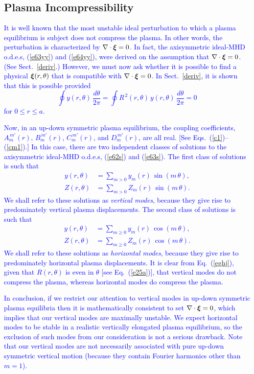 \documentclass[12pt,prb,aps]{revtex4-1}
\newcommand {\bxi}{\mbox{\boldmath$\xi$}}
\begin{document}
\subsection{Plasma Incompressibility}\label{incomp}
\textcolor{blue}{
It is well known that the most unstable ideal perturbation to which a plasma equilibrium is subject does not compress the plasma. In other words,
the perturbation is characterized by $\nabla\cdot\bxi=0$.\cite{gs1} In fact, the axisymmetric ideal-MHD o.d.e.s, (\ref{e63yy}) and (\ref{e64yy}), were derived
on the assumption that $\nabla\cdot \bxi=0$. (See Sect.~\ref{deriv}.) However, we must now ask whether it is possible to find a physical $\bxi(r,\theta)$ that is compatible
with $\nabla\cdot \bxi=0$. In Sect.~\ref{deriv}, it is shown that this is  possible provided 
\begin{equation}\label{eghj}
\oint y(r,\theta)\,\frac{d\theta}{2\pi}= \oint R^{\,2}(r,\theta)\,y(r,\theta)\,\frac{d\theta}{2\pi}=0
\end{equation}
for $0\leq r\leq a$.}

\textcolor{blue}{
Now, in an up-down symmetric plasma equilibrium, the coupling coefficients, $A_m^{\,m'}(r)$, $B_m^{\,m'}(r)$, $C_{m}^{\,m'}(r)$, and $D_m^{\,m'}(r)$,
are all real. [See Eqs.~(\ref{c1})--(\ref{cm1}).] 
In this case, there are two independent classes of solutions to the axisymmetric ideal-MHD o.d.e.s, (\ref{e62s}) and (\ref{e63s}). 
The first class of solutions is such that
\begin{align}
y(r,\theta)&= \sum_{m>0} y_m(r)\,\sin(m\,\theta),\\[0.5ex]
Z(r,\theta)&= \sum_{m>0} Z_m(r)\,\sin(m\,\theta).
\end{align}
We shall refer to these solutions as {\em vertical modes}, because they give rise to predominately vertical plasma displacements. 
The second class of solutions is such that
\begin{align}
y(r,\theta)&= \sum_{m\geq 0} y_m(r)\,\cos(m\,\theta),\\[0.5ex]
Z(r,\theta)&= \sum_{m\geq 0} Z_m(r)\,\cos(m\,\theta).
\end{align}
We shall refer to these solutions as {\em horizontal modes}, because they give rise to predominately horizontal plasma displacements. 
It is clear from Eq.~(\ref{eghj}), given that $R(r,\theta)$ is even in $\theta$ [see Eq.~(\ref{e25a})], that vertical modes do not compress the
plasma, whereas horizontal modes do compress the plasma.\cite{reb}}

\textcolor{blue}{In conclusion, if we restrict our attention to vertical modes in up-down symmetric plasma equilibria then it is mathematically consistent  to set $\nabla\cdot\bxi=0$,
which implies that our vertical modes are maximally unstable. We expect horizontal modes to be stable in a realistic vertically elongated
plasma equilibrium,\cite{reb} so the exclusion of such modes from our consideration is not a serious drawback. Note that our vertical
modes are not necessarily associated with pure up-down symmetric vertical motion (because they contain Fourier harmonics other than $m=1$).\cite{ros} }
\end{document}

